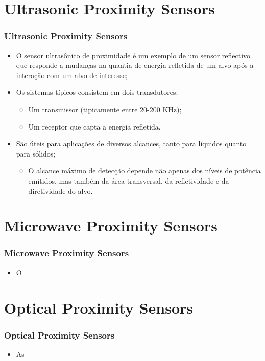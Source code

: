 \documentclass[xcolor=dvipsnames, aspectratio=169]{beamer}
\begin{document}
\section[Ultrasonic Proximity Sensors]{Ultrasonic Proximity Sensors} 
\begin{frame}
\frametitle{Ultrasonic Proximity Sensors}
	\begin{itemize}
		\item O sensor ultrasônico de proximidade é um exemplo de um sensor reflectivo que responde a mudanças na quantia de energia refletida de um alvo após a interação com um alvo de interesse;
		\item Os sistemas típicos consistem em dois transdutores:
		\begin{itemize}
			\item Um transmissor (tipicamente entre 20-200 KHz);
			\item Um receptor que capta a energia refletida.
		\end{itemize}
		\item São úteis para aplicações de diversos alcances, tanto para líquidos quanto para sólidos;
		\begin{itemize}
			\item O alcance máximo de detecção depende não apenas dos níveis de potência emitidos, mas também da área transversal, da refletividade e da diretividade do alvo.
		\end{itemize} 

	\end{itemize}
\end{frame}

\section[Microwave Proximity Sensors]{Microwave Proximity Sensors} 
\begin{frame}
\frametitle{Microwave Proximity Sensors}
	\begin{itemize}
		\item O 
	\end{itemize}
\end{frame}

\section[Optical Proximity Sensors]{Optical Proximity Sensors} 
\begin{frame}
\frametitle{Optical Proximity Sensors}
	\begin{itemize}
		\item As
	\end{itemize}
\end{frame}
\end{document}
